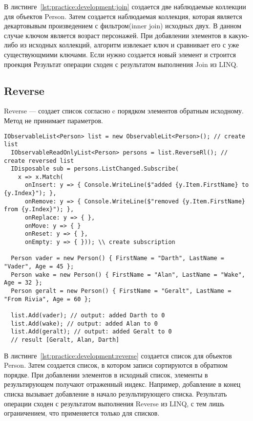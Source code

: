 В листинге~\ref{lst:practice:development:join} создается две наблюдаемые коллекции для объектов Person. Затем создается наблюдаемая коллекция,
которая является декартовывым произведением с фильтром(inner join) исходных двух. В данном случае ключом является возраст персонажей.
При добавлении элементов в какую-либо из исходных коллекций, алгоритм извлекает ключ и сравнивает его с уже существующмими ключами. Если нужно создается новый элемент и строится проекция
Результат операции сходен с результатом выполнения Join из LINQ.

\subsection{Reverse}
\label{sub:development:reverse}

Reverse --- создает список согласно c порядком элементов обратным исходному.
Метод не принимает параметров.

\begin{lstlisting}[style=csharpinlinestyle, caption={Пример использования Reverse}, label=lst:practice:development:reverse]
  IObservableList<Person> list = new ObservableLit<Person>(); // create list
  IObservableReadOnlyList<Person> persons = list.ReverseRl(); // create reversed list
  IDisposable sub = persons.ListChanged.Subscribe(
    x => x.Match(
      onInsert: y => { Console.WriteLine($"added {y.Item.FirstName} to {y.Index}"); },
      onRemove: y => { Console.WriteLine($"removed {y.Item.FirstName} from {y.Index}"); },
      onReplace: y => { },
      onMove: y => { }
      onReset: y => { },
      onEmpty: y => { })); \\ create subscription

  Person vader = new Person() { FirstName = "Darth", LastName = "Vader", Age = 45 };
  Person wake = new Person() { FirstName = "Alan", LastName = "Wake", Age = 32 };
  Person geralt = new Person() { FirstName = "Geralt", LastName = "From Rivia", Age = 60 };

  list.Add(vader); // output: added Darth to 0
  list.Add(wake); // output: added Alan to 0
  list.Add(geralt); // output: added Geralt to 0
  // result [Geralt, Alan, Darth]
\end{lstlisting}

В листинге~\ref{lst:practice:development:reverse} создается список для объектов Person. Затем создается список, в котором записи сортируются в обратном порядке.
При добавлении элементов в исходный список, элементы в результирующем получают отраженный индекс. Например, добавление в конец списка вызывает добавление в начало результирующего списка.
Результать операции сходен с результатом выполнения Reverse из LINQ, с тем лишь ограничением, что применяется только для списков.

